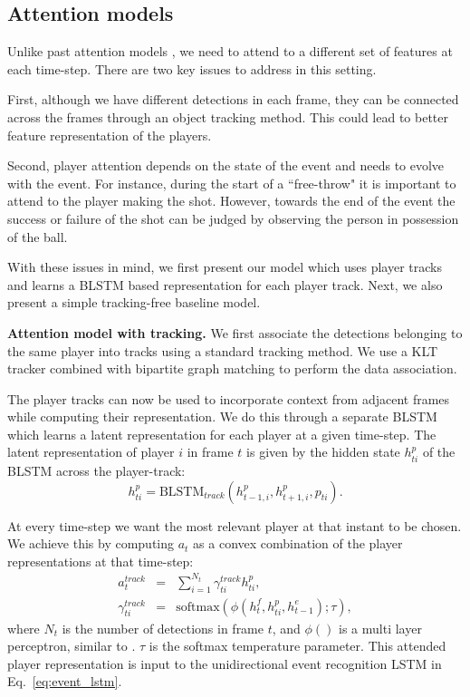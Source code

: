 \subsection{Attention models}
Unlike past attention models \cite{}, we need to attend to a different set of
features at each time-step. There are two key issues to address in this
setting.

First, although we have different detections in each frame, they
can be connected across the frames through an object tracking
method. This could lead to better feature representation of the
players.

Second, player attention depends on the state of the event and needs to evolve
with the event.  For instance, during the start of a ``free-throw" it is
important to attend to the player making the shot. However, towards the end of
the event the success or failure of the shot can be judged by observing the
person in possession of the ball.

With these issues in mind, we first present our model which uses player tracks
and learns a BLSTM based representation for each player track. Next, we also
present a simple tracking-free baseline model.

\noindent \textbf{Attention model with tracking.}
We first associate the detections
belonging to the same player into tracks using a standard
tracking method. We use a KLT tracker combined with
bipartite graph matching \cite{munkres1957algorithms} to perform the data association.

The player tracks can now be used to incorporate context
from adjacent frames while computing their representation.
We do this through a separate BLSTM which learns a latent
representation for each player at a given time-step.
The latent representation of player $i$ in frame $t$ is
given by the hidden state
$h_{ti}^p$ of the BLSTM across the player-track:
\[
  h_{ti}^p = \mbox{BLSTM}_{track}(h_{t-1,i}^p, h_{t+1,i}^p, p_{ti}).
\]

At every time-step we want the most relevant player at that
instant to be chosen. We achieve this by computing
$a_t$ as a convex combination of the player representations
at that time-step:
\begin{eqnarray} 
\label{eq:track}
  a_t^{track} & = & \sum_{i=1}^{N_t} \gamma_{ti}^{track} h_{ti}^p, \\ \nonumber
  \gamma_{ti}^{track} & = & \text{softmax} \left(\phi\left(h^f_t, h^p_{ti}, h^e_{t-1}\right); \tau\right),
\end{eqnarray}where $N_t$ is the number of detections in frame $t$, and $\phi()$ is a 
multi layer perceptron, similar to \cite{Bahdnau_arxiv14}. $\tau$ is the softmax temperature parameter.
This attended player representation is input to the
unidirectional event recognition LSTM in Eq.~\ref{eq:event_lstm}.

